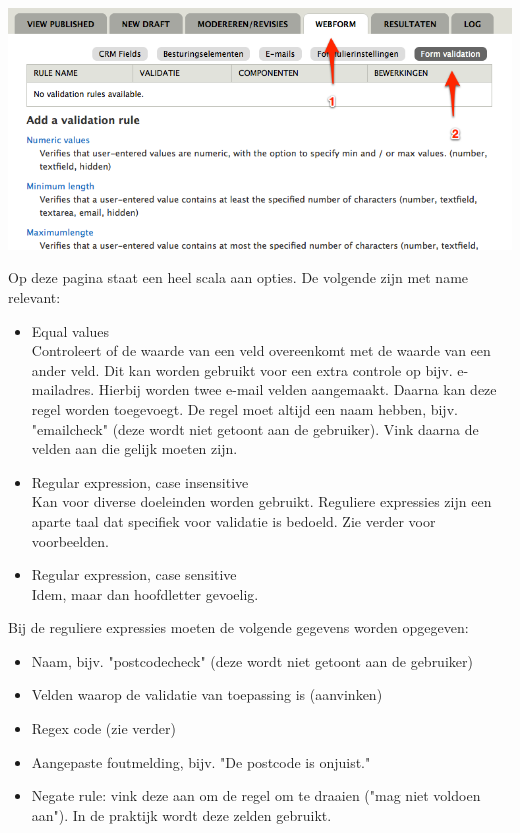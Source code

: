 \begin{center}
\includegraphics[width=\textwidth]{img/formvalidation.png}
\end{center}

Op deze pagina staat een heel scala aan opties. De volgende zijn met name relevant:
\begin{itemize}
\item Equal values \\
Controleert of de waarde van een veld overeenkomt met de waarde van een ander veld. Dit kan worden gebruikt voor een extra controle op bijv. e-mailadres. Hierbij worden twee e-mail velden aangemaakt. Daarna kan deze regel worden toegevoegt. De regel moet altijd een naam hebben, bijv. "emailcheck" (deze wordt niet getoont aan de gebruiker). Vink daarna de velden aan die gelijk moeten zijn.
\item Regular expression, case insensitive \\
Kan voor diverse doeleinden worden gebruikt. Reguliere expressies zijn een aparte taal dat specifiek voor validatie is bedoeld. Zie verder voor voorbeelden.
\item Regular expression, case sensitive \\
Idem, maar dan hoofdletter gevoelig.
\end{itemize}
Bij de reguliere expressies moeten de volgende gegevens worden opgegeven:
\begin{itemize}
\item Naam, bijv. "postcodecheck" (deze wordt niet getoont aan de gebruiker)
\item Velden waarop de validatie van toepassing is (aanvinken)
\item Regex code (zie verder)
\item Aangepaste foutmelding, bijv. "De postcode is onjuist."
\item Negate rule: vink deze aan om de regel om te draaien ("mag niet voldoen aan"). In de praktijk wordt deze zelden gebruikt.
\end{itemize}
